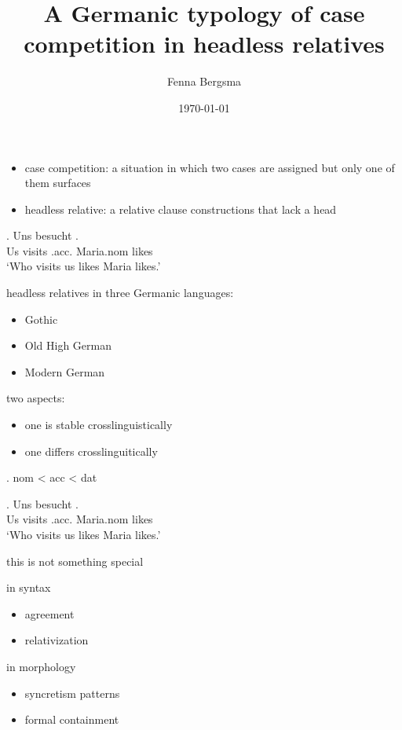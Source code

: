 \documentclass[11pt,hidelinks]{memoir}
\title{A Germanic typology of case competition in headless relatives}
\author{Fenna Bergsma}
\date{\today}
\begin{document}
\begin{itemize}
  \item case competition: a situation in which two cases are assigned but only one of them surfaces
  \item headless relative: a relative clause constructions that lack a head
\end{itemize}

\exg. Uns besucht   .\\
 Us visits\scsub{[nom]} .\ac{acc}. Maria.\ac{nom} likes\scsub{[acc]}\\
 `Who visits us likes Maria likes.' \label{ex:mg-nom-acc}


headless relatives in three Germanic languages:
\begin{itemize}
  \item Gothic
  \item Old High German
  \item Modern German
\end{itemize}

two aspects:
\begin{itemize}
  \item one is stable crosslinguistically
  \item one differs crosslinguitically
\end{itemize}


\ex. \ac{nom} < \ac{acc} < \ac{dat}

\exg. Uns besucht   .\\
 Us visits\scsub{[nom]} .\ac{acc}. Maria.\ac{nom} likes\scsub{[acc]}\\
 `Who visits us likes Maria likes.' \label{ex:mg-nom-acc}

this is not something special

in syntax
\begin{itemize}
  \item agreement
  \item relativization
\end{itemize}

in morphology
\begin{itemize}
  \item syncretism patterns
  \item formal containment
\end{itemize}
\end{document}

